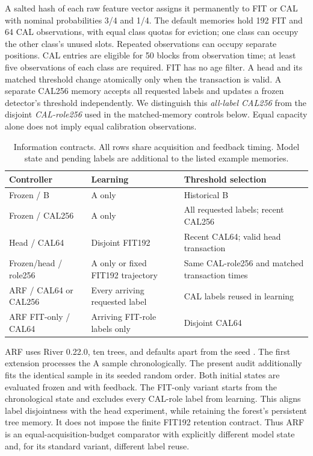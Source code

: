 A salted hash of each raw feature vector assigns it permanently to FIT or CAL with nominal probabilities 3/4 and 1/4. The default memories hold 192 FIT and 64 CAL observations, with equal class quotas for eviction; one class can occupy the other class's unused slots. Repeated observations can occupy separate positions. CAL entries are eligible for 50 blocks from observation time; at least five observations of each class are required. FIT has no age filter. A head and its matched threshold change atomically only when the transaction is valid. A separate CAL256 memory accepts all requested labels and updates a frozen detector's threshold independently. We distinguish this \emph{all-label CAL256} from the disjoint \emph{CAL-role256} used in the matched-memory controls below. Equal capacity alone does not imply equal calibration observations.

\begin{table}[tb]
\centering\small
\caption{Information contracts. All rows share acquisition and feedback timing. Model state and pending labels are additional to the listed example memories.}
\label{tab:contracts}
\begin{tabularx}{\linewidth}{lXX}
\toprule
Controller & Learning & Threshold selection \\
\midrule
Frozen / B & A only & Historical B \\
Frozen / CAL256 & A only & All requested labels; recent CAL256 \\
Head / CAL64 & Disjoint FIT192 & Recent CAL64; valid head transaction \\
Frozen/head / role256 & A only or fixed FIT192 trajectory & Same CAL-role256 and matched transaction times \\
ARF / CAL64 or CAL256 & Every arriving requested label & CAL labels reused in learning \\
ARF FIT-only / CAL64 & Arriving FIT-role labels only & Disjoint CAL64 \\
\bottomrule
\end{tabularx}
\end{table}

ARF uses River 0.22.0, ten trees, and defaults apart from the seed \citep{riverdocs}. The first extension processes the A sample chronologically. The present audit additionally fits the identical sample in its seeded random order. Both initial states are evaluated frozen and with feedback. The FIT-only variant starts from the chronological state and excludes every CAL-role label from learning. This aligns label disjointness with the head experiment, while retaining the forest's persistent tree memory. It does not impose the finite FIT192 retention contract. Thus ARF is an equal-acquisition-budget comparator with explicitly different model state and, for its standard variant, different label reuse.

